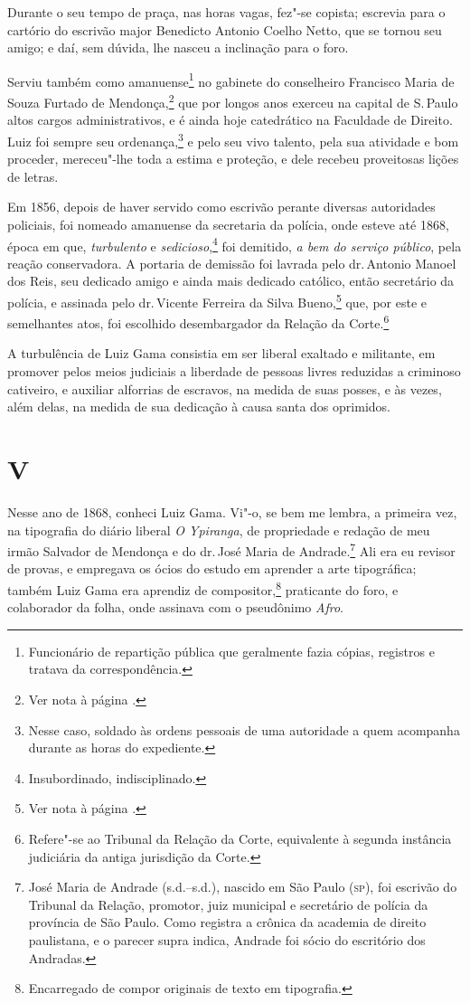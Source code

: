Durante o seu tempo de praça, nas horas vagas, fez"-se copista; escrevia
para o cartório do escrivão major Benedicto Antonio Coelho Netto, que se
tornou seu amigo; e daí, sem dúvida, lhe nasceu a inclinação para o
foro.

Serviu também como amanuense\footnote{Funcionário de repartição
  pública que geralmente fazia cópias, registros e tratava da
  correspondência.} no gabinete do conselheiro Francisco Maria de Souza
Furtado de Mendonça,\footnote{Ver nota à página \pageref{fmfm}.} que por longos anos exerceu na capital de S.\,Paulo
altos cargos administrativos, e é ainda hoje catedrático na Faculdade de
Direito. Luiz foi sempre seu ordenança,\footnote{Nesse caso, soldado às
  ordens pessoais de uma autoridade a quem acompanha durante as horas do
  expediente.} e pelo seu vivo talento, pela sua atividade e bom
proceder, mereceu"-lhe toda a estima e proteção, e dele recebeu
proveitosas lições de letras.

Em 1856, depois de haver servido como escrivão perante diversas
autoridades policiais, foi nomeado amanuense da secretaria da polícia,
onde esteve até 1868, época em que, \emph{turbulento} e
\emph{sedicioso},\footnote{Insubordinado, indisciplinado.} foi
demitido, \emph{a bem do serviço público}, pela reação conservadora. A
portaria de demissão foi lavrada pelo dr.\,Antonio Manoel dos Reis, seu
dedicado amigo e ainda mais dedicado católico, então secretário da
polícia, e assinada pelo dr.\,Vicente Ferreira da Silva Bueno,\footnote{
  Ver nota à página \pageref{bueno}.} que, por este e
semelhantes atos, foi escolhido desembargador da Relação da
Corte.\footnote{Refere"-se ao Tribunal da Relação da Corte, equivalente
  à segunda instância judiciária da antiga jurisdição da Corte.}

A turbulência de Luiz Gama consistia em ser liberal exaltado e
militante, em promover pelos meios judiciais a liberdade de pessoas
livres reduzidas a criminoso cativeiro, e auxiliar alforrias de
escravos, na medida de suas posses, e às vezes, além delas, na medida de
sua dedicação à causa santa dos oprimidos.

\section*{V}

Nesse ano de 1868, conheci Luiz Gama. Vi"-o, se bem me lembra, a primeira
vez, na tipografia do diário liberal \emph{O Ypiranga}, de propriedade e
redação de meu irmão Salvador de Mendonça e do dr.\,José Maria de
Andrade.\footnote{José Maria de Andrade (s.d.--s.d.), nascido em São \label{maria}
  Paulo (\textsc{sp}), foi escrivão do Tribunal da Relação, promotor, juiz
  municipal e secretário de polícia da província de São Paulo. Como
  registra a crônica da academia de direito paulistana, e o parecer
  supra indica, Andrade foi sócio do escritório dos Andradas.} Ali era
eu revisor de provas, e empregava os ócios do estudo em aprender a arte
tipográfica; também Luiz Gama era aprendiz de compositor,\footnote{
  Encarregado de compor originais de texto em tipografia.} praticante
do foro, e colaborador da folha, onde assinava com o pseudônimo
\emph{Afro}.

